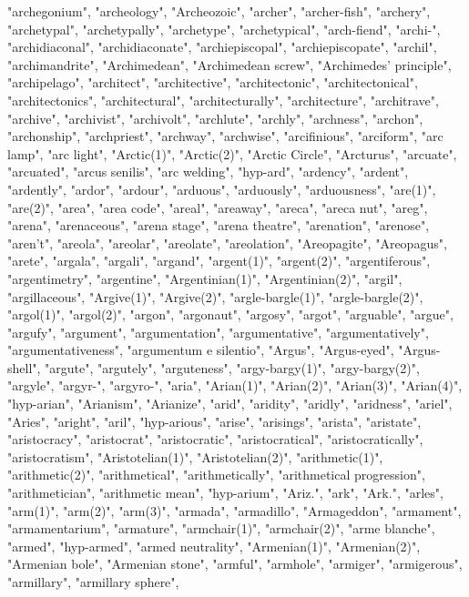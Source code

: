 "archegonium",
"archeology",
"Archeozoic",
"archer",
"archer-fish",
"archery",
"archetypal",
"archetypally",
"archetype",
"archetypical",
"arch-fiend",
"archi-",
"archidiaconal",
"archidiaconate",
"archiepiscopal",
"archiepiscopate",
"archil",
"archimandrite",
"Archimedean",
"Archimedean screw",
"Archimedes' principle",
"archipelago",
"architect",
"architective",
"architectonic",
"architectonical",
"architectonics",
"architectural",
"architecturally",
"architecture",
"architrave",
"archive",
"archivist",
"archivolt",
"archlute",
"archly",
"archness",
"archon",
"archonship",
"archpriest",
"archway",
"archwise",
"arcifinious",
"arciform",
"arc lamp",
"arc light",
"Arctic(1)",
"Arctic(2)",
"Arctic Circle",
"Arcturus",
"arcuate",
"arcuated",
"arcus senilis",
"arc welding",
"hyp-ard",
"ardency",
"ardent",
"ardently",
"ardor",
"ardour",
"arduous",
"arduously",
"arduousness",
"are(1)",
"are(2)",
"area",
"area code",
"areal",
"areaway",
"areca",
"areca nut",
"areg",
"arena",
"arenaceous",
"arena stage",
"arena theatre",
"arenation",
"arenose",
"aren't",
"areola",
"areolar",
"areolate",
"areolation",
"Areopagite",
"Areopagus",
"arete",
"argala",
"argali",
"argand",
"argent(1)",
"argent(2)",
"argentiferous",
"argentimetry",
"argentine",
"Argentinian(1)",
"Argentinian(2)",
"argil",
"argillaceous",
"Argive(1)",
"Argive(2)",
"argle-bargle(1)",
"argle-bargle(2)",
"argol(1)",
"argol(2)",
"argon",
"argonaut",
"argosy",
"argot",
"arguable",
"argue",
"argufy",
"argument",
"argumentation",
"argumentative",
"argumentatively",
"argumentativeness",
"argumentum e silentio",
"Argus",
"Argus-eyed",
"Argus-shell",
"argute",
"argutely",
"arguteness",
"argy-bargy(1)",
"argy-bargy(2)",
"argyle",
"argyr-",
"argyro-",
"aria",
"Arian(1)",
"Arian(2)",
"Arian(3)",
"Arian(4)",
"hyp-arian",
"Arianism",
"Arianize",
"arid",
"aridity",
"aridly",
"aridness",
"ariel",
"Aries",
"aright",
"aril",
"hyp-arious",
"arise",
"arisings",
"arista",
"aristate",
"aristocracy",
"aristocrat",
"aristocratic",
"aristocratical",
"aristocratically",
"aristocratism",
"Aristotelian(1)",
"Aristotelian(2)",
"arithmetic(1)",
"arithmetic(2)",
"arithmetical",
"arithmetically",
"arithmetical progression",
"arithmetician",
"arithmetic mean",
"hyp-arium",
"Ariz.",
"ark",
"Ark.",
"arles",
"arm(1)",
"arm(2)",
"arm(3)",
"armada",
"armadillo",
"Armageddon",
"armament",
"armamentarium",
"armature",
"armchair(1)",
"armchair(2)",
"arme blanche",
"armed",
"hyp-armed",
"armed neutrality",
"Armenian(1)",
"Armenian(2)",
"Armenian bole",
"Armenian stone",
"armful",
"armhole",
"armiger",
"armigerous",
"armillary",
"armillary sphere",
